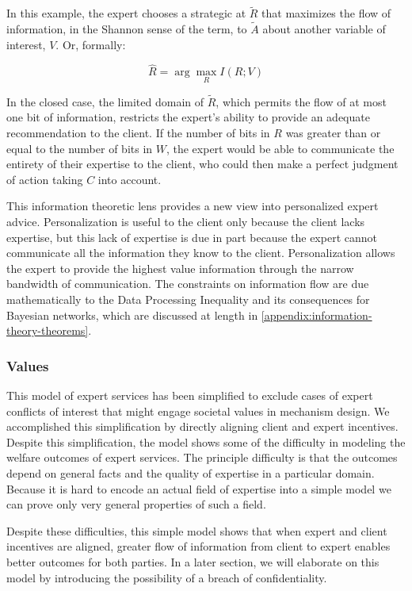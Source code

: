 \documentclass[../thesis.tex]{subfiles}
\begin{document}
In this example, the expert chooses a strategic at
$\tilde{R}$ that maximizes the flow of information,
in the Shannon sense of the term,
to $\tilde{A}$ about another variable of interest,
$V$. Or, formally:

$$\hat{R} = \arg \max_{R} I(R;V)$$

In the closed case, the limited domain of $\tilde{R}$,
which permits the flow of at most one bit of information,
restricts the expert's ability to provide an adequate
recommendation to the client.
If the number of bits in $R$ was greater than or
equal to the number of bits in $W$, the expert would
be able to communicate the entirety of their expertise
to the client, who could then make a perfect judgment
of action taking $C$ into account.

This information theoretic lens provides a new view
into personalized expert advice.
Personalization is useful to the client only because
the client lacks expertise, but this lack of expertise
is due in part because the expert cannot communicate
all the information they know to the client.
Personalization allows the expert to provide the highest
value information through the narrow bandwidth of
communication.
The constraints on information flow are due mathematically
to the Data Processing Inequality and its consequences
for Bayesian networks, which are discussed at length in
\ref{appendix:information-theory-theorems}.

\subsubsection{Values}

This model of expert services has been simplified
to exclude cases of expert conflicts of interest
that might engage societal values in mechanism
design.
We accomplished this simplification by directly
aligning client and expert incentives.
Despite this simplification, the model
shows some of the difficulty in modeling
the welfare outcomes of expert services.
The principle difficulty is that the outcomes
depend on general facts and the quality of
expertise in a particular domain.
Because it is hard to encode an actual field
of expertise into a simple model we can prove only
very general properties of
such a field.

Despite these difficulties, this simple model
shows that when expert and client incentives
are aligned, greater flow of information
from client to expert enables better outcomes
for both parties.
In a later section, we will elaborate
on this model by introducing the possibility
of a breach of confidentiality.
\end{document}
